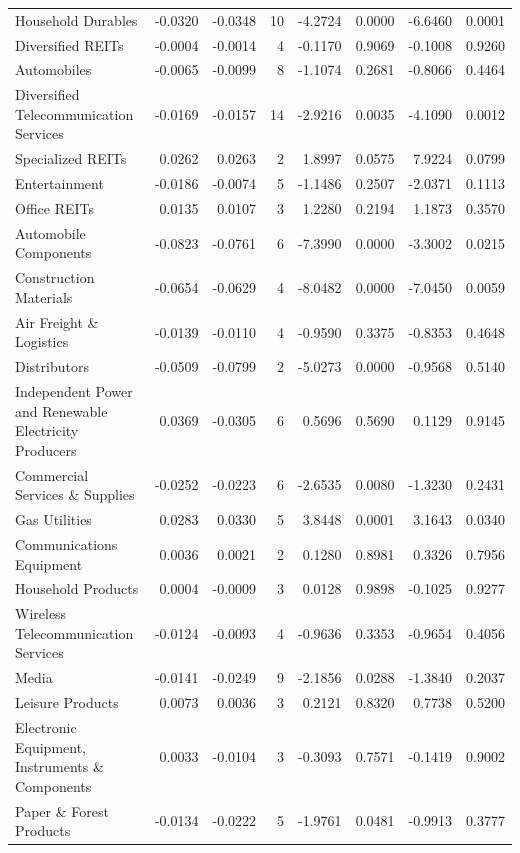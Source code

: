 \begin{table}
\begin{tabular}{lrrrrrrr}
Household Durables & -0.0320 & -0.0348 & 10 & -4.2724 & 0.0000 & -6.6460 & 0.0001 \\
Diversified REITs & -0.0004 & -0.0014 & 4 & -0.1170 & 0.9069 & -0.1008 & 0.9260 \\
Automobiles & -0.0065 & -0.0099 & 8 & -1.1074 & 0.2681 & -0.8066 & 0.4464 \\
Diversified Telecommunication Services & -0.0169 & -0.0157 & 14 & -2.9216 & 0.0035 & -4.1090 & 0.0012 \\
Specialized REITs & 0.0262 & 0.0263 & 2 & 1.8997 & 0.0575 & 7.9224 & 0.0799 \\
Entertainment & -0.0186 & -0.0074 & 5 & -1.1486 & 0.2507 & -2.0371 & 0.1113 \\
Office REITs & 0.0135 & 0.0107 & 3 & 1.2280 & 0.2194 & 1.1873 & 0.3570 \\
Automobile Components & -0.0823 & -0.0761 & 6 & -7.3990 & 0.0000 & -3.3002 & 0.0215 \\
Construction Materials & -0.0654 & -0.0629 & 4 & -8.0482 & 0.0000 & -7.0450 & 0.0059 \\
Air Freight \& Logistics & -0.0139 & -0.0110 & 4 & -0.9590 & 0.3375 & -0.8353 & 0.4648 \\
Distributors & -0.0509 & -0.0799 & 2 & -5.0273 & 0.0000 & -0.9568 & 0.5140 \\
Independent Power and Renewable Electricity Producers & 0.0369 & -0.0305 & 6 & 0.5696 & 0.5690 & 0.1129 & 0.9145 \\
Commercial Services \& Supplies & -0.0252 & -0.0223 & 6 & -2.6535 & 0.0080 & -1.3230 & 0.2431 \\
Gas Utilities & 0.0283 & 0.0330 & 5 & 3.8448 & 0.0001 & 3.1643 & 0.0340 \\
Communications Equipment & 0.0036 & 0.0021 & 2 & 0.1280 & 0.8981 & 0.3326 & 0.7956 \\
Household Products & 0.0004 & -0.0009 & 3 & 0.0128 & 0.9898 & -0.1025 & 0.9277 \\
Wireless Telecommunication Services & -0.0124 & -0.0093 & 4 & -0.9636 & 0.3353 & -0.9654 & 0.4056 \\
Media & -0.0141 & -0.0249 & 9 & -2.1856 & 0.0288 & -1.3840 & 0.2037 \\
Leisure Products & 0.0073 & 0.0036 & 3 & 0.2121 & 0.8320 & 0.7738 & 0.5200 \\
Electronic Equipment, Instruments \& Components & 0.0033 & -0.0104 & 3 & -0.3093 & 0.7571 & -0.1419 & 0.9002 \\
Paper \& Forest Products & -0.0134 & -0.0222 & 5 & -1.9761 & 0.0481 & -0.9913 & 0.3777 \\

\end{tabular}
\end{table}
